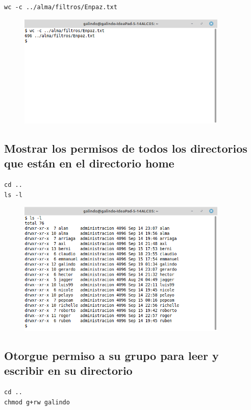 \documentclass[11pt]{article}
\begin{document}
\begin{verbatim}
wc -c ../alma/filtros/Enpaz.txt
\end{verbatim}

\begin{figure}[htbp]
\centering
\includegraphics[width=10cm]{img/a16.png}
\caption{}
\end{figure}

\cite{linux_wc}

\subsection{Mostrar los permisos de todos los directorios que están en el directorio home}
\label{sec:org9917072}
\begin{verbatim}
cd ..
ls -l
\end{verbatim}

\begin{figure}[htbp]
\centering
\includegraphics[width=10cm]{img/a17.png}
\caption{}
\end{figure}

\cite{linux_ls}

\subsection{Otorgue permiso a su grupo para leer y escribir en su directorio}
\label{sec:org8aa1563}
\begin{verbatim}
cd ..
chmod g+rw galindo
\end{verbatim}
\end{document}
